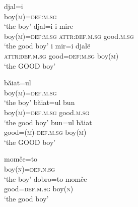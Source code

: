 \begin{exe}
\ex 
{} 
\begin{xlist}
\ex \label{definfl alb}
\gll	djal=i\\
	boy(\textsc{m})=\textsc{def:m.sg}\\
\glt	‘the boy’
\ex \label{encl alb a}
\gll	djal=i 				i 			mire\\
	boy(\textsc{m})=\textsc{def:m.sg} 	\textsc{attr:def.m.sg}	good.\textsc{m.sg}\\
\glt	‘the good boy’
\ex \label{encl alb b}
\gll	i 			mir=i 			djalë\\
	\textsc{attr:def.m.sg} 	good=\textsc{def:m.sg} 	boy(\textsc{m})\\
\glt	‘the GOOD boy’ 
\end{xlist}
\ex 
{}
\begin{xlist}
\ex \label{definfl rum}
\gll	băiat=ul\\
	boy(\textsc{m})=\textsc{def.m.sg}\\
\glt	‘the boy’
\ex \label{encl rum a}
\gll	băiat=ul 				bun\\
	boy(\textsc{m})=\textsc{def.m.sg} 	good.\textsc{m.sg}\\
\glt	‘the good boy’
\ex \label{encl rum b}
\gll	bun=ul 					băiat\\
	good=(\textsc{m})-\textsc{def.m.sg} 	boy(\textsc{m})\\
\glt	‘the GOOD boy’
\end{xlist}
\ex
{}
\begin{xlist}
\ex \label{definfl bg}
\gll	momče=to\\
	boy(\textsc{n})=\textsc{def.n.sg}\\
\glt	‘the boy’
\ex \label{encl bg}
\gll	dobro=to 		momče\\
	good=\textsc{def.m.sg}	boy(\textsc{n})\\
\glt	‘the good boy’
\end{xlist}	
\end{exe}
